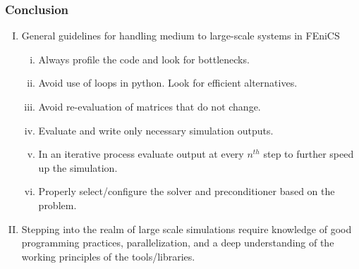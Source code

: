 \label{conclusion}
\begin{frame}\frametitle{Conclusion}
  \begin{enumerate} [(I)]
	\item General guidelines for handling medium to large-scale systems in FEniCS
	\begin{enumerate} [(i)]
      \item Always profile the code and look for bottlenecks.
      \item Avoid use of loops in python. Look for efficient alternatives.
      \item Avoid re-evaluation of matrices that do not change.
      \item Evaluate and write only necessary simulation outputs.
      \item In an iterative process evaluate output at every $n^{th}$ step to further speed up the simulation.
	  \item Properly select/configure the solver and preconditioner based on the problem.

	\end{enumerate}
	\item Stepping into the realm of large scale simulations require knowledge of good programming practices, parallelization, and a deep understanding of the working principles of the tools/libraries.
  \end{enumerate}
\end{frame}
